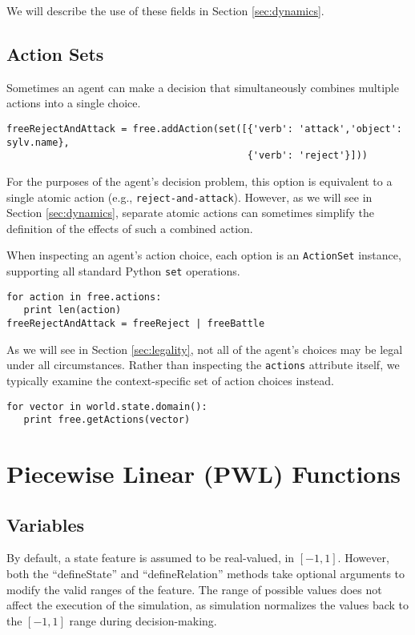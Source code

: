 \documentclass{article}
\begin{document}
We will describe the use of these fields in Section \ref{sec:dynamics}.

\subsection{Action Sets}

Sometimes an agent can make a decision that simultaneously combines multiple actions into a single choice.

\begin{verbatim}
freeRejectAndAttack = free.addAction(set([{'verb': 'attack','object': sylv.name},
                                          {'verb': 'reject'}]))
\end{verbatim}

For the purposes of the agent's decision problem, this option is equivalent to a single atomic action (e.g., {\tt reject-and-attack}). However, as we will see in Section \ref{sec:dynamics}, separate atomic actions can sometimes simplify the definition of the effects of such a combined action.

When inspecting an agent's action choice, each option is an {\tt ActionSet} instance, supporting all standard Python {\tt set} operations.

\begin{verbatim}
for action in free.actions:
   print len(action)
freeRejectAndAttack = freeReject | freeBattle
\end{verbatim}

As we will see in Section \ref{sec:legality}, not all of the agent's choices may be legal under all circumstances. Rather than inspecting the {\tt actions} attribute itself, we typically examine the context-specific set of action choices instead.

\begin{verbatim}
for vector in world.state.domain():
   print free.getActions(vector)
\end{verbatim}

\section{Piecewise Linear (PWL) Functions}

\subsection{Variables}
By default, a state feature is assumed to be real-valued, in $[-1,1]$. However, both the ``defineState'' and ``defineRelation'' methods take optional arguments to modify the valid ranges of the feature. The range of possible values does not affect the execution of the simulation, as simulation normalizes the values back to the $[-1,1]$ range during decision-making.
\end{document}
